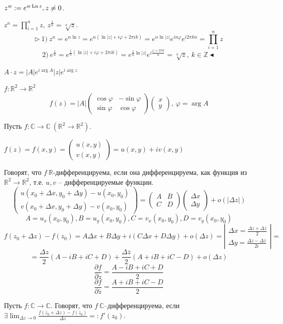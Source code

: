  $z^w := e^{w\operatorname{Ln} z}, z \neq 0$.

 $z^n = \prod_{i=1}^n z, \ z^{\frac{1}{n}} = \sqrt[n]{z}$.
\[\triangleright \ 1)\ z^n = e^{n \ln z} = e^{n(\ln|z|+i\varphi+2\pi i k)} = e^{n\ln |z|}e^{in\varphi}e^{i2\pi kn} = \prod_{i=1}^n z\]
\[2)\ e^{\frac{1}{n}}=e^{\frac{1}{n} (\ln |z| + i\varphi + 2\pi ik)} = e^{\frac{1}{n}\ln|z|}e^{i\frac{\varphi+2\pi k}{n}} = \sqrt[n]{z}, \ k \in \mathbb{Z} \blacktriangleleft\]

$A\cdot z = |A| e^{i\arg A}|z|e^{i\arg z}$

$f: \mathbb{R}^2\to\mathbb{R}^2$
\[f(z) = |A|\left(\begin{array}{ll}\cos \varphi & -\sin \varphi \\
\sin \varphi & \cos \varphi \end{array}\right)\left(\begin{array}{ll} x \\ y    
\end{array}\right), \ \varphi = \arg A\]

 Пусть $f: \mathbb{C}\to\mathbb{C} \ (\mathbb{R}^2\to \mathbb{R}^2)$.

$f(z) =f(x, y) = \left(\begin{array}{ll} u(x, y) \\ v(x, y) \end{array}\right) = u(x, y) + iv(x,y)$

Говорят, что $f \ \mathbb{R}$-дифференцируема, если она дифференцируема, как функция из $\mathbb{R}^2\to\mathbb{R}^2$, т.е. $u, v$ -- дифференцируемые функции.
\[\left(\begin{array}{ll}u(x_0+\Delta x, y_0+\Delta y)-u(x_0,y_0)\\ v(x_0+\Delta x, y_0 + \Delta y) - v(x_0, y_0)\end{array}\right) = \left(\begin{array}{ll}
A & B \\ C & D
\end{array}\right) \left(\begin{array}{ll}
\Delta x \\ \Delta y    
\end{array}\right) + o(|\Delta z|) \] 
\[A=u_x(x_0, y_0), B = u_y(x_0, y_0), C = v_x(x_0, y_0), D = v_y(x_0, y_0)\]
\[f(z_0+\Delta z)-f(z_0)=A\Delta x+B\Delta y + i(C\Delta x + D\Delta y)+o(\Delta z) = \left|\begin{array}{ll}
    \Delta x = \frac{\Delta z + \Delta \overline{z}}{2} \\
    \Delta y = \frac{\Delta z - \Delta \overline{z}}{2i}
\end{array}\right| =\]
\[= \frac{\Delta z}{2}(A -iB+iC+D)+\frac{\Delta \overline{z}}{2}(A+iB+iC-D) + o(\Delta z)\]
\[\frac{\partial f}{\partial z} = \frac{A -iB+iC+D}{2}\]
\[\frac{\partial f}{\partial \overline{z}} = \frac{A+iB+iC-D}{2}\]

 Пусть $f:\mathbb{C}\to\mathbb{C}$. Говорят, что $f \ \mathbb{C}$--дифференцируема, если $\exists \lim_{\Delta z\to 0} \frac{f(z_0+\Delta z)-f(z_0)}{\Delta z} =: f'(z_0)$.
